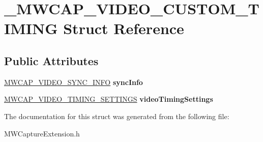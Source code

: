 \hypertarget{struct__MWCAP__VIDEO__CUSTOM__TIMING}{\section{\-\_\-\-M\-W\-C\-A\-P\-\_\-\-V\-I\-D\-E\-O\-\_\-\-C\-U\-S\-T\-O\-M\-\_\-\-T\-I\-M\-I\-N\-G Struct Reference}
\label{struct__MWCAP__VIDEO__CUSTOM__TIMING}
}
\subsection*{Public Attributes}
\begin{DoxyCompactItemize}
\item 
\hypertarget{struct__MWCAP__VIDEO__CUSTOM__TIMING_a803cf78f165bd108e820f0cfd1052aff}{\hyperlink{struct__MWCAP__VIDEO__SYNC__INFO}{M\-W\-C\-A\-P\-\_\-\-V\-I\-D\-E\-O\-\_\-\-S\-Y\-N\-C\-\_\-\-I\-N\-F\-O} {\bfseries sync\-Info}}\label{struct__MWCAP__VIDEO__CUSTOM__TIMING_a803cf78f165bd108e820f0cfd1052aff}

\item 
\hypertarget{struct__MWCAP__VIDEO__CUSTOM__TIMING_a334bfece54e3724e2a4adde47043a2be}{\hyperlink{struct__MWCAP__VIDEO__TIMING__SETTINGS}{M\-W\-C\-A\-P\-\_\-\-V\-I\-D\-E\-O\-\_\-\-T\-I\-M\-I\-N\-G\-\_\-\-S\-E\-T\-T\-I\-N\-G\-S} {\bfseries video\-Timing\-Settings}}\label{struct__MWCAP__VIDEO__CUSTOM__TIMING_a334bfece54e3724e2a4adde47043a2be}

\end{DoxyCompactItemize}


The documentation for this struct was generated from the following file\-:\begin{DoxyCompactItemize}
\item 
M\-W\-Capture\-Extension.\-h\end{DoxyCompactItemize}
